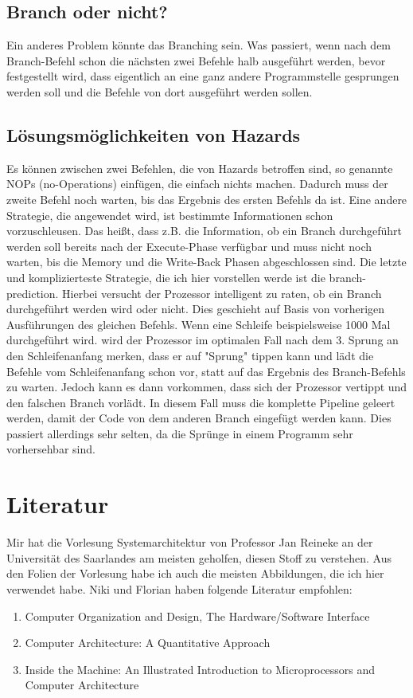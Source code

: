 \documentclass[12pt, a4paper]{article}
\begin{document}
\subsection{Branch oder nicht?}
Ein anderes Problem könnte das Branching sein. Was passiert, wenn nach dem Branch-Befehl schon die nächsten zwei Befehle halb ausgeführt werden, bevor festgestellt wird, dass eigentlich an eine ganz andere Programmstelle gesprungen werden soll und die Befehle von dort ausgeführt werden sollen.

\subsection{Lösungsmöglichkeiten von Hazards}
Es können zwischen zwei Befehlen, die von Hazards betroffen sind, so genannte NOPs (no-Operations) einfügen, die einfach nichts machen. Dadurch muss der zweite Befehl noch warten, bis das Ergebnis des ersten Befehls da ist. Eine andere Strategie, die angewendet wird, ist bestimmte Informationen schon vorzuschleusen. Das heißt, dass z.B. die Information, ob ein Branch durchgeführt werden soll bereits nach der Execute-Phase verfügbar und muss nicht noch warten, bis die Memory und die Write-Back Phasen abgeschlossen sind. Die letzte und komplizierteste Strategie, die ich hier vorstellen werde ist die branch-prediction. Hierbei versucht der Prozessor intelligent zu raten, ob ein Branch durchgeführt werden wird oder nicht. Dies geschieht auf Basis von vorherigen Ausführungen des gleichen Befehls. Wenn eine Schleife beispielsweise 1000 Mal durchgeführt wird. wird der Prozessor im optimalen Fall nach dem 3. Sprung an den Schleifenanfang merken, dass er auf "Sprung" tippen kann und lädt die Befehle vom Schleifenanfang schon vor, statt auf das Ergebnis des Branch-Befehls zu warten. Jedoch kann es dann vorkommen, dass sich der Prozessor vertippt und den falschen Branch vorlädt. In diesem Fall muss die komplette Pipeline geleert werden, damit der Code von dem anderen Branch eingefügt werden kann. Dies passiert allerdings sehr selten, da die Sprünge in einem Programm sehr vorhersehbar sind.

\section{Literatur}
Mir hat die Vorlesung Systemarchitektur von Professor Jan Reineke an der Universität des Saarlandes am meisten geholfen, diesen Stoff zu verstehen. Aus den Folien der Vorlesung habe ich auch die meisten Abbildungen, die ich hier verwendet habe. Niki und Florian haben folgende Literatur empfohlen:
\begin{enumerate}
	\item Computer Organization and Design, The Hardware/Software Interface
	\item Computer Architecture: A Quantitative Approach
	\item Inside the Machine: An Illustrated Introduction to Microprocessors and Computer Architecture
\end{enumerate}
\end{document}
